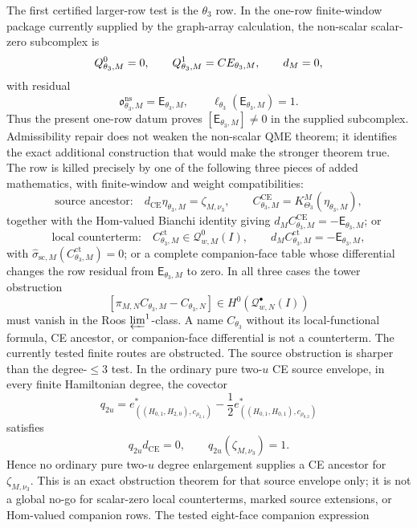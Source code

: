\begin{enumerate}
  The first certified larger-row test is the \(\theta_3\) row.  In the
  one-row finite-window package currently supplied by the graph-array
  calculation, the non-scalar scalar-zero subcomplex is
  \[
    Q^0_{\theta_3,M}=0,\qquad
    Q^1_{\theta_3,M}
      =CE_{\theta_3,M},\qquad d_M=0,
  \]
  with residual
  \[
    \mathfrak o^{\mathrm{ns}}_{\theta_3,M}
      =\mathsf E_{\theta_3,M},\qquad
    \ell_{\theta_3}(\mathsf E_{\theta_3,M})=1 .
  \]
  Thus the present one-row datum proves
  \([\mathsf E_{\theta_3,M}]\ne0\) in the supplied subcomplex.
  Admissibility repair does not weaken the non-scalar QME theorem; it identifies the
  exact additional construction that would make the stronger theorem true.
  The row is killed precisely by one of the following three pieces of
  added mathematics, with finite-window and weight compatibilities:
  \[
    \text{source ancestor:}\quad
    d_{\mathrm{CE}}\eta_{\theta_3,M}=\zeta_{M,\nu_3},\qquad
    C^{\mathrm{CE}}_{\theta_3,M}=K^M_{\Theta_3}(\eta_{\theta_3,M}),
  \]
  together with the Hom-valued Bianchi identity giving
  \(d_M C^{\mathrm{CE}}_{\theta_3,M}=-\mathsf E_{\theta_3,M}\);
  or
  \[
    \text{local counterterm:}\quad
    C^{\mathrm{ct}}_{\theta_3,M}\in\mathcal Q^0_{w,M}(I),\qquad
    d_M C^{\mathrm{ct}}_{\theta_3,M}=-\mathsf E_{\theta_3,M},
  \]
  with \(\widehat\sigma_{\mathrm{sc},M}(C^{\mathrm{ct}}_{\theta_3,M})=0\);
  or a complete companion-face table whose differential changes the
  row residual from \(\mathsf E_{\theta_3,M}\) to zero.  In all three
  cases the tower obstruction
  \[
    [\pi_{M,N}C_{\theta_3,M}-C_{\theta_3,N}]
      \in H^0(\mathcal Q^\bullet_{w,N}(I))
  \]
  must vanish in the Roos \(\varprojlim^1\)-class.  A name
  \(C_{\theta_3}\) without its local-functional formula, CE ancestor, or
  companion-face differential is not a counterterm.
  The currently tested finite routes are obstructed.  The source
  obstruction is sharper than the degree-\(\le3\) test.  In the ordinary
  pure two-\(u\) CE source envelope, in every finite Hamiltonian degree,
  the covector
  \[
    q_{2u}
    =
    e^*_{((H_{0,1},H_{2,0}),c_{\rho_{2,1}})}
    -\frac12
    e^*_{((H_{0,1},H_{0,1}),c_{\rho_{0,2}})}
  \]
  satisfies
  \[
    q_{2u}d_{\mathrm{CE}}=0,\qquad
    q_{2u}(\zeta_{M,\nu_3})=1.
  \]
  Hence no ordinary pure two-\(u\) degree enlargement supplies a CE
  ancestor for \(\zeta_{M,\nu_3}\).  This is an exact obstruction theorem
  for that source envelope only; it is not a global no-go for
  scalar-zero local counterterms, marked source extensions, or
  Hom-valued companion rows.  The tested eight-face companion expression

\end{enumerate}
